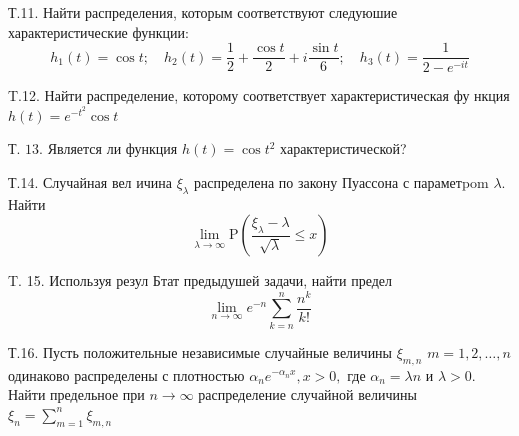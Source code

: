 \documentclass[a4paper,12pt]{article} %
\begin{document}
\begin{example}

Т.11. Найти распределения, которым соответствуют следуюшие характеристические функции:
$$
h_{1}(t)=\cos t ; \quad h_{2}(t)=\frac{1}{2}+\frac{\cos t}{2}+i \frac{\sin t}{6} ; \quad h_{3}(t)=\frac{1}{2-e^{-i t}}
$$




\end{example}





\begin{example}


T.12. Найти распределение, которому соответствует характеристическая фу нкция $h(t)=e^{-t^{2}} \cos t$



\end{example}







\begin{example}

Т. $13 .$ Является ли функция $h(t)=\cos t^{2}$ характеристической?




\end{example}



\begin{example}

Т.14. Случайная вел ичина $\xi_{\lambda}$ распределена по закону Пуассона с параметpom $\lambda .$ Найти
$$
\lim _{\lambda \rightarrow \infty} \mathrm{P}\left(\frac{\xi_{\lambda}-\lambda}{\sqrt{\lambda}} \leqslant x\right)
$$




\end{example}



\begin{example}

T. 15. Используя резул Бтат предыдушей задачи, найти предел
$$
\lim _{n \rightarrow \infty} e^{-n} \sum_{k=n}^{n} \frac{n^{k}}{k !}
$$




\end{example}





\begin{example}

Т.16. Пусть положительные независимые случайные величины $\xi_{m, n}$ $m=1,2, \ldots, n$ одинаково распределены с плотностью $\alpha_{n} e^{-\alpha_{n} x}, x>0,$ где $\alpha_{n}=\lambda n$ и $\lambda>0 .$ Найти предельное при $n \rightarrow \infty$ распределение случайной величины $\xi_{n}=\sum_{m=1}^{n} \xi_{m, n}$




\end{example}
\end{document}
